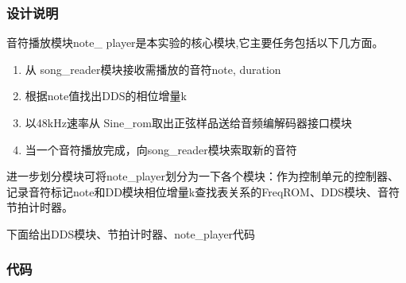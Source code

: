 \documentclass{../source/zjureport}
\begin{document}
        \subsubsection{设计说明}
        音符播放模块note_ player是本实验的核心模块,它主要任务包括以下几方面。
        \begin{enumerate}
            \item 从 song_reader模块接收需播放的音符{note, duration}
            \item 根据note值找出DDS的相位增量k
            \item 以48kHz速率从 Sine_rom取出正弦样品送给音频编解码器接口模块
            \item 当一个音符播放完成，向song_reader模块索取新的音符
        \end{enumerate}
        进一步划分模块可将note_player划分为一下各个模块：作为控制单元的控制器、记录音符标记note和DD模块相位增量k查找表关系的FreqROM、DDS模块、音符节拍计时器。

        下面给出DDS模块、节拍计时器、note_player代码

        \subsubsection{代码}
        

        
\end{document}

